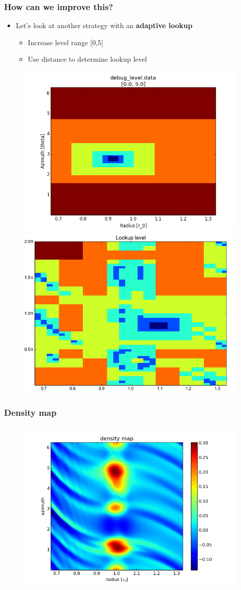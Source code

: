 \documentclass{beamer}
\begin{document}
\begin{frame}
 \frametitle{How can we improve this?}
\begin{itemize}
  \item Let's look at another strategy with an \textbf{adaptive lookup}
  \begin{itemize}
  \item Increase level range [0,5]
  \item Use distance to determine lookup level
  \end{itemize}
 \end{itemize}

 \begin{figure}[H]
  \centering
  \includegraphics[width=.5\textwidth]{../../../Sara/plots/adaptive_lookup.png}     \includegraphics[width=.45\textwidth]{../../../Sara/run/default/debug_level-euclid.png}
\end{figure}
\end{frame}
\begin{frame}
 \frametitle{Density map}
 \begin{figure}[H]
  \centering
  \includegraphics[width=.8\textwidth]{density.png}
 \end{figure} 
\end{frame}
\end{document}
